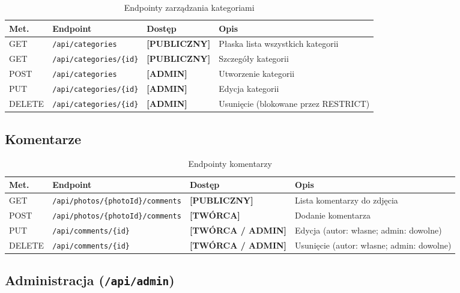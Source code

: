 \documentclass[12pt, a4paper]{article}
\begin{document}
\begin{table}[H]
  \centering
  \caption{Endpointy zarządzania kategoriami}
  \begin{tabular}{@{}L{1.5cm}L{5cm}L{2.5cm}L{5cm}@{}}
    \toprule
    \textbf{Met.} & \textbf{Endpoint} & \textbf{Dostęp} & \textbf{Opis} \\
    \midrule
    GET    & \texttt{/api/categories}        & \textbf{[PUBLICZNY]} & Płaska lista wszystkich kategorii \\
    GET    & \texttt{/api/categories/\{id\}} & \textbf{[PUBLICZNY]} & Szczegóły kategorii \\
    POST   & \texttt{/api/categories}        & \textbf{[ADMIN]}     & Utworzenie kategorii \\
    PUT    & \texttt{/api/categories/\{id\}} & \textbf{[ADMIN]}     & Edycja kategorii \\
    DELETE & \texttt{/api/categories/\{id\}} & \textbf{[ADMIN]}     & Usunięcie (blokowane przez RESTRICT) \\
    \bottomrule
  \end{tabular}
\end{table}

\subsection{Komentarze}

\begin{table}[H]
  \centering
  \caption{Endpointy komentarzy}
  \begin{tabular}{@{}L{1.5cm}L{5.5cm}L{2.5cm}L{4.5cm}@{}}
    \toprule
    \textbf{Met.} & \textbf{Endpoint} & \textbf{Dostęp} & \textbf{Opis} \\
    \midrule
    GET    & \texttt{/api/photos/\{photoId\}/comments} & \textbf{[PUBLICZNY]}      & Lista komentarzy do zdjęcia \\
    POST   & \texttt{/api/photos/\{photoId\}/comments} & \textbf{[TWÓRCA]}         & Dodanie komentarza \\
    PUT    & \texttt{/api/comments/\{id\}}             & \textbf{[TWÓRCA / ADMIN]} & Edycja (autor: własne; admin: dowolne) \\
    DELETE & \texttt{/api/comments/\{id\}}             & \textbf{[TWÓRCA / ADMIN]} & Usunięcie (autor: własne; admin: dowolne) \\
    \bottomrule
  \end{tabular}
\end{table}

\subsection{Administracja (\texttt{/api/admin})}
\end{document}
